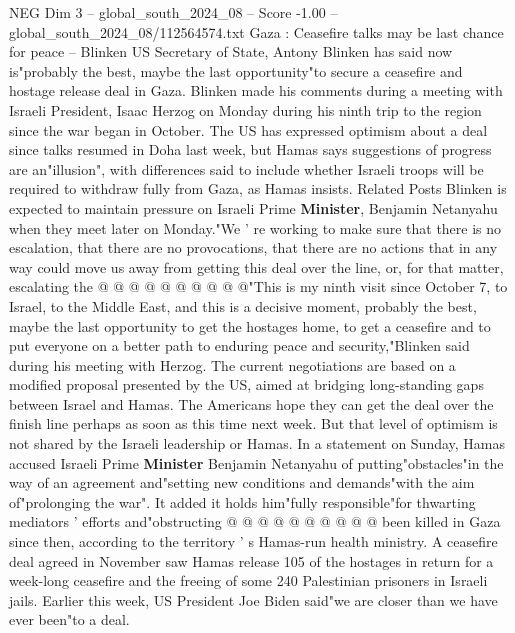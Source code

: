 \begin{textsample}{NEG Dim 3 – global\_south\_2024\_08 – Score -1.00 – global\_south\_2024\_08/112564574.txt}  \label{ex:f3_neg_157}
Gaza : Ceasefire talks may be last chance for peace -- Blinken US Secretary of State, Antony Blinken has said now is"probably the best, maybe the last opportunity"to secure a ceasefire and hostage release deal in Gaza.
Blinken made his comments during a meeting with Israeli President, Isaac Herzog on Monday during his ninth trip to the region since the war began in October.
The US has expressed optimism about a deal since talks resumed in Doha last week, but Hamas says suggestions of progress are an"illusion", with differences said to include whether Israeli troops will be required to withdraw fully from Gaza, as Hamas insists.
Related Posts Blinken is expected to maintain pressure on Israeli Prime \textbf{Minister}, Benjamin Netanyahu when they meet later on Monday."We ' re working to make sure that there is no escalation, that there are no provocations, that there are no actions that in any way could move us away from getting this deal over the line, or, for that matter, escalating the @ @ @ @ @ @ @ @ @ @"This is my ninth visit since October 7, to Israel, to the Middle East, and this is a decisive moment, probably the best, maybe the last opportunity to get the hostages home, to get a ceasefire and to put everyone on a better path to enduring peace and security,"Blinken said during his meeting with Herzog.
The current negotiations are based on a modified proposal presented by the US, aimed at bridging long-standing gaps between Israel and Hamas.
The Americans hope they can get the deal over the finish line perhaps as soon as this time next week.
But that level of optimism is not shared by the Israeli leadership or Hamas.
In a statement on Sunday, Hamas accused Israeli Prime \textbf{Minister} Benjamin Netanyahu of putting"obstacles"in the way of an agreement and"setting new conditions and demands"with the aim of"prolonging the war".
It added it holds him"fully responsible"for thwarting mediators ' efforts and"obstructing @ @ @ @ @ @ @ @ @ @ been killed in Gaza since then, according to the territory ' s Hamas-run health ministry.
A ceasefire deal agreed in November saw Hamas release 105 of the hostages in return for a week-long ceasefire and the freeing of some 240 Palestinian prisoners in Israeli jails.
Earlier this week, US President Joe Biden said"we are closer than we have ever been"to a deal.

\end{textsample}
